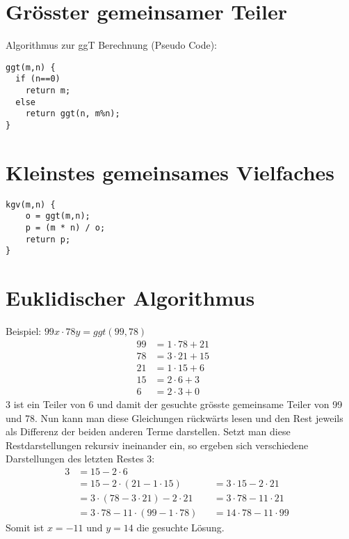 \renewcommand{\thesection}{\Alph{section}}
\appendix
{}
\section{Grösster gemeinsamer Teiler} %
Algorithmus zur ggT Berechnung (Pseudo Code):
\begin{lstlisting}
ggt(m,n) {
  if (n==0)
    return m;
  else
    return ggt(n, m%n);
}
\end{lstlisting}

\section{Kleinstes gemeinsames Vielfaches} %
\label{sec:kleinstes_gemeinsames_vielfaches}
\begin{lstlisting}
kgv(m,n) {
    o = ggt(m,n);
    p = (m * n) / o;
    return p;
}
\end{lstlisting}

\section{Euklidischer Algorithmus} %
\label{sec:euklidischer_algorithmus}
Beispiel: \(99x \cdot 78y = ggt(99,78)\)
\begin{align*}
99 &= 1 \cdot 78 + 21 && \\
78 &= 3 \cdot 21 + 15 &&\\
21 &= 1 \cdot 15 + 6 &&\\
15 &= 2 \cdot 6 + 3 &&\\
 6 &= 2 \cdot 3 + 0 &&
\end{align*}
\(3\) ist ein Teiler von 6 und damit der gesuchte grösste gemeinsame Teiler von 99 und 78.
Nun kann man diese Gleichungen rückwärts lesen und den Rest jeweils als Differenz der beiden anderen Terme darstellen. Setzt man diese Restdarstellungen rekursiv ineinander ein, so ergeben sich verschiedene Darstellungen des letzten Restes 3:
\begin{align*}
	3 &= 15 - 2 \cdot 6 \\
	&= 15 - 2 \cdot (21 - 1 \cdot 15) & &= 3 \cdot 15 - 2 \cdot 21 &\\
	&= 3\cdot (78 - 3 \cdot 21) - 2 \cdot 21 & &= 3 \cdot 78 - 11 \cdot 21 &\\
	&= 3 \cdot 78 - 11 \cdot (99-1 \cdot 78) & &= 14 \cdot 78 - 11 \cdot 99 &
\end{align*}
Somit ist \(x = -11\) und \(y=14\) die gesuchte Lösung.

